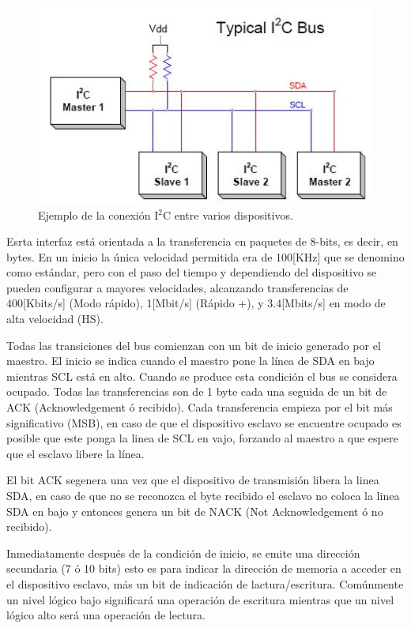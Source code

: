 \documentclass[letterpaper,12pt,oneside]{book}
\begin{document}
			\begin{figure}[!htpb]
				\centering
				\includegraphics[scale = 0.8]{Material de Consulta/ConectionI2C.PNG}
				\caption[Conexión I$^2$C entre dispositivos]{Ejemplo de la conexión I$^2$C entre varios dispositivos.}
				\label{I2CConEx}
			\end{figure}

			Esrta interfaz está orientada a la transferencia en paquetes de 8-bits, es decir, en bytes. En un inicio la única velocidad permitida era de 100[KHz] que se denomino como estándar, pero con el paso del tiempo y dependiendo del dispositivo se pueden configurar a mayores velocidades, alcanzando transferencias de 400[Kbits/s] (Modo rápido), 1[Mbit/s] (Rápido +), y 3.4[Mbits/s] en modo de alta velocidad (HS).

			Todas las transiciones del bus comienzan con un bit de inicio generado por el maestro. El inicio se indica cuando el maestro pone la línea de SDA en bajo mientras SCL está en alto. Cuando se produce esta condición el bus se considera ocupado. Todas las transferencias son de 1 byte cada una seguida de un bit de ACK (Acknowledgement ó recibido). Cada transferencia empieza por el bit más significativo (MSB), en caso de que el dispositivo esclavo se encuentre ocupado es posible que este ponga la linea de SCL en vajo, forzando al maestro a que espere que el esclavo libere la línea.

			El bit ACK segenera una vez que el dispositivo de transmisión libera la linea SDA, en caso de que no se reconozca el byte recibido el esclavo no coloca la linea SDA en bajo y entonces genera un bit de NACK (Not Acknowledgement ó no recibido).

			Inmediatamente después de la condición de inicio, se emite una dirección secundaria (7 ó 10 bits) esto es para indicar la dirección de memoria a acceder en el dispositivo esclavo, más un bit de indicación de lactura/escritura. Comúnmente un nivel lógico bajo significará una operación de escritura mientras que un nivel lógico alto será una operación de lectura.
\end{document}

